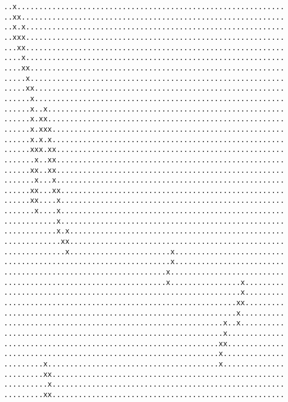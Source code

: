 {%
\fontsize{3}{0}%
\selectfont%
\begin{verbatim}..x.............................................................
..xx............................................................
..x.x...........................................................
..xxx...........................................................
...xx...........................................................
....x...........................................................
....xx..........................................................
.....x..........................................................
.....xx.........................................................
......x.........................................................
......x..x......................................................
......x.xx......................................................
......x.xxx.....................................................
......x.x.x.....................................................
......xxx.xx....................................................
.......x..xx....................................................
......xx..xx....................................................
.......x...x....................................................
......xx...xx...................................................
......xx....x...................................................
.......x....x...................................................
............x...................................................
............x.x.................................................
.............xx.................................................
..............x.......................x.........................
......................................x.........................
.....................................x..........................
.....................................x................x.........
......................................................x.........
.....................................................xx.........
.....................................................x..........
..................................................x..x..........
..................................................x.............
.................................................xx.............
.................................................x..............
.........x.......................................x..............
.........xx.....................................................
..........x.....................................................
.........xx.....................................................

\end{verbatim}}
